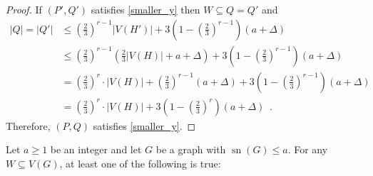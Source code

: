 \documentclass{patmorin}
\DeclareMathOperator{\sep}{sn}
\begin{document}
\begin{proof}
  If $(P',Q')$ satisfies \cref{smaller_y} then $W\subseteq Q=Q'$ and
  \begin{align*}
     |Q|=|Q'|
      & \le (\tfrac{2}{3})^{r-1}|V(H')|+3(1-(\tfrac{2}{3})^{r-1})(a+\Delta) \\
      & \le (\tfrac{2}{3})^{r-1}(\tfrac{2}{3}|V(H)|+a+\Delta)+3(1-(\tfrac{2}{3})^{r-1})(a+\Delta) \\
      & = (\tfrac{2}{3})^r\cdot|V(H)|+ (\tfrac{2}{3})^{r-1}(a+\Delta)+3(1-(\tfrac{2}{3})^{r-1})(a+\Delta) \\
      & = (\tfrac{2}{3})^r\cdot|V(H)|+ 3(1-(\tfrac{2}{3})^{r})(a+\Delta) \enspace .
  \end{align*}
  Therefore, $(P,Q)$ satisfies \cref{smaller_y}.
\end{proof}


\begin{lem}
  Let $a\ge 1$ be an integer and let $G$ be a graph with $\sep(G)\le a$.  For any $W\subseteq V(G)$, at least one of the following is true:
\end{lem}
\end{document}
